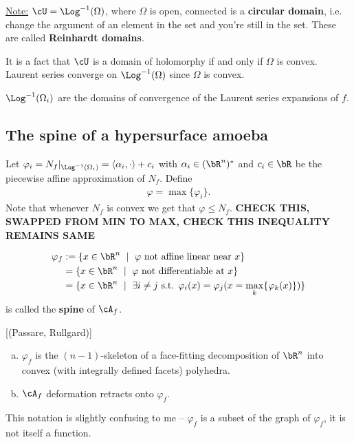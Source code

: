 \underline{Note:} $\cU = \Log^{-1}(\Omega)$, where $\Omega$ is open, connected is a \textbf{circular domain}, i.e. change the argument of an element in the set and you're still in the set. These are called \textbf{Reinhardt domains}.

It is a fact that $\cU$ is a domain of holomorphy if and only if $\Omega$ is convex. Laurent series converge on $\Log^{-1}(\Omega)$ since $\Omega$ is convex.

\begin{cor}\label{cor:domains-of-conv-for-f}
  $\Log^{-1}(\Omega_i)$ are the domains of convergence of the Laurent series expansions of $f$.
\end{cor}

\subsection{The spine of a hypersurface amoeba}
Let $\varphi_i = N_f|_{\Log^{-1}(\Omega_i)} = \langle \alpha_i, \cdot \rangle + c_i$ with $\alpha_i \in (\bR^n)^*$ and $c_i \in \bR$ be the piecewise affine approximation of $N_f$. Define 
\begin{align*}
  \varphi = \max\{\varphi_i\}.
\end{align*}
Note that whenever $N_f$ is convex we get that $\varphi \leq N_f$. \textbf{CHECK THIS, SWAPPED FROM MIN TO MAX, CHECK THIS INEQUALITY REMAINS SAME}
\begin{defn}\label{defn:spine-of-amoeba}
  \begin{align*}
    \varphi_f &:= \{x \in \bR^n ~\mid ~ \varphi \text{ not affine linear near } x\} \\
              &= \{x \in \bR^n ~\mid~ \varphi \text{ not differentiable at } x\} \\
              &= \{x \in \bR^n ~\mid~ \exists i \neq j \text{ s.t. } \varphi_i(x) = \varphi_j(x = \max_k\{\varphi_k(x)\})\}
  \end{align*}
  is called the \textbf{spine} of $\cA_f$.
\end{defn}

\begin{thm}\label{thm:basic-spine-facts}[(Passare, Rullgard)]
  \begin{enumerate}[(a)]
    \item $\varphi_f$ is the $(n-1)$-skeleton of a face-fitting decomposition of $\bR^n$ into convex (with integrally defined facets) polyhedra.
    \item $\cA_f$ deformation retracts onto $\varphi_f$.
  \end{enumerate}
\end{thm}
This notation is slightly confusing to me -- $\varphi_f$ is a subset of the graph of $\varphi_f$, it is not itself a function.

